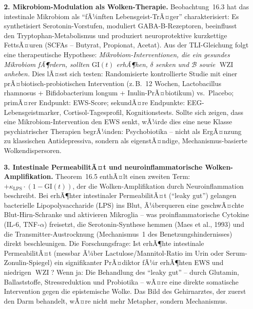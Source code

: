 ﻿\documentclass[12pt,a4paper]{report}
\theoremstyle{plain}
\theoremstyle{definition}
\theoremstyle{remark}
\DeclareMathOperator{\WZI}{WZI}
\begin{document}
	\textbf{2. Mikrobiom-Modulation als Wolken-Therapie.}
	Beobachtung~16.3 hat das intestinale Mikrobiom als ``fÃ¼nften
	Lebensgeist-TrÃ¤ger'' charakterisiert: Es synthetisiert
	Sero\-tonin-Vorstufen, moduliert GABA-B-Rezeptoren, beeinflusst
	den Tryptophan-Metabolis\-mus und produziert neuroprotektive
	kurzkettige FettsÃ¤uren (SCFAs -- Butyrat, Propionat, Acetat).
	Aus der TLI-Gleichung folgt eine therapeutische Hypothese:
	\emph{Mikrobiom-Interventionen, die ein gesundes Mikrobiom
	fÃ¶rdern, sollten $\mathrm{GI}(t)$ erhÃ¶hen, $\delta$ senken
	und $\mathcal{B}$ sowie $\WZI$ anheben.}
	Dies lÃ¤sst sich testen: Randomisierte kontrollierte Studie
	mit einer prÃ¤biotisch-probiotischen Intervention (z.\,B.\ 12 Wochen,
	Lactobacillus rhamnosus + Bifidobacterium longum + Inulin-PrÃ¤biotikum)
	vs.\ Placebo; primÃ¤rer Endpunkt: EWS-Score; sekundÃ¤re Endpunkte:
	EEG-Lebensgeistmarker, Cortisol-Tagesprofil, Kognitionstests.
	Sollte sich zeigen, dass eine Mikrobiom-Intervention den EWS senkt,
	wÃ¼rde dies eine neue Klasse psychiatrischer Therapien begrÃ¼nden:
	Psychobiotika -- nicht als ErgÃ¤nzung zu klassischen Antidepressiva,
	sondern als eigenstÃ¤ndige, Mechanismus-basierte Wolkendispersoren.

	\textbf{3. Intestinale PermeabilitÃ¤t und neuroinflammatorische
		Wolken-Amplifikation.}
	Theorem~16.5 enthÃ¤lt einen zweiten Term:
	$+\kappa_{\mathrm{LPS}} \cdot (1 - \mathrm{GI}(t))$,
	der die Wolken-Amplifikation durch Neuroinflammation beschreibt.
	Bei erhÃ¶hter intestinaler PermeabilitÃ¤t (``leaky gut'') gelangen
	bacterielle Lipopolysaccharide (LPS) ins Blut, Ã¼berqueren eine
	geschwÃ¤chte Blut-Hirn-Schranke und aktivieren Mikroglia --
	was proinflammatorische Cytokine (IL-6, TNF-$\alpha$) freisetzt,
	die Serotonin-Synthese hemmen (Maes et al., 1993) und
	die Transmitter-Austrocknung (Mechanismus~1 des Benetzungs\-hindernisses)
	direkt beschleunigen.
	Die Forschungsfrage: Ist erhÃ¶hte intestinale PermeabilitÃ¤t
	(messbar Ã¼ber Lactulose/Mannitol-Ratio im Urin oder
	Serum-Zonulin-Spiegel) ein signifikanter PrÃ¤diktor fÃ¼r
	erhÃ¶hten EWS und niedrigen $\WZI$?
	Wenn ja: Die Behandlung des ``leaky gut'' -- durch Glutamin,
	Ballaststoffe, Stressreduktion und Probiotika -- wÃ¤re eine
	direkte somatische Intervention gegen die epistemische Wolke.
	Das Bild des Gehirnarztes, der zuerst den Darm behandelt,
	wÃ¤re nicht mehr Metapher, sondern Mechanismus.
\end{document}
